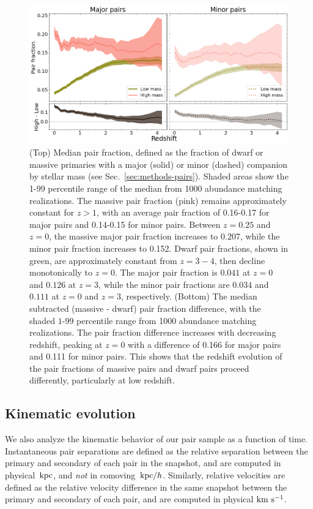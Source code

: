 \documentclass[twocolumn]{aastex631}
\begin{document}
    \label{sec:results}
    \begin{figure}[htp]
      \centering
      \includegraphics[width=\textwidth]{pairfrac_1000.png}
      \caption{
        (Top) Median pair fraction, defined as the fraction of dwarf or massive primaries with a major (solid) or minor (dashed) companion by stellar mass (see Sec.~\ref{sec:methods-pairs}). 
        Shaded areas show the 1-99 percentile range of the median from 1000 abundance matching realizations. 
        The massive pair fraction (pink) remains approximately constant for $z>1$, with an average pair fraction of 0.16-0.17 for major pairs and 0.14-0.15 for minor pairs. Between $z=0.25$ and $z=0$, the massive major pair fraction increases to 0.207, while the minor pair fraction increases to 0.152.
        Dwarf pair fractions, shown in green, are approximately constant from $z=3-4$, then decline monotonically to $z=0$. The major pair fraction is $0.041$ at $z=0$ and $0.126$ at $z=3$, while the minor pair fractions are $0.034$ and $0.111$ at $z=0$ and $z=3$, respectively. 
        (Bottom) The median subtracted (massive - dwarf) pair fraction difference, with the shaded $1$-$99$ percentile range from 1000 abundance matching realizations. The pair fraction difference increases with decreasing redshift, peaking at $z=0$ with a difference of 0.166 for major pairs and 0.111 for minor pairs. This shows that the redshift evolution of the pair fractions of massive pairs and dwarf pairs proceed differently, particularly at low redshift.}
      \label{fig:pairratio}
    \end{figure}

    \subsection{Kinematic evolution}\label{sec:results-kinematics}
    We also analyze the kinematic behavior of our pair sample as a function of time. 
    Instantaneous pair separations are defined as the relative separation between the primary and secondary of each pair in the snapshot, and are computed in physical $\mathrm{\,kpc}$, and \textit{not} in comoving $\mathrm{\,kpc}/h$. 
    Similarly, relative velocities are defined as the relative velocity difference in the same snapshot between the primary and secondary of each pair, and are computed in physical $\mathrm{km}~\mathrm{s}^{-1}$.
    
\end{document}
